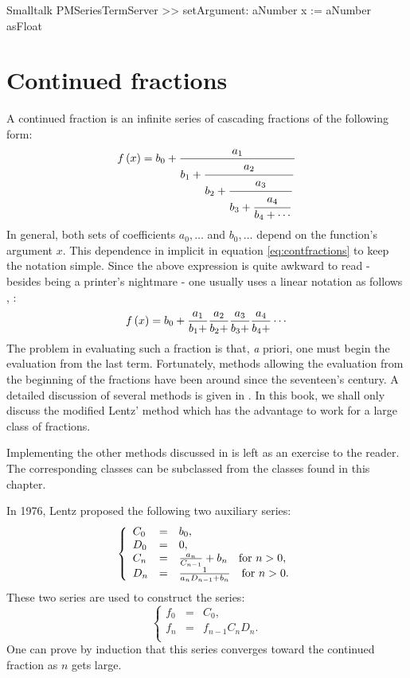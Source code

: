 \begin{displaycode}{Smalltalk}
PMSeriesTermServer >> setArgument: aNumber
    x := aNumber asFloat
\end{displaycode}

\section{Continued fractions}
\label{sec:contfractions}
A continued fraction is an infinite series of cascading fractions of the following form:
\begin{equation}
\label{eq:contfractions}
  f\left( x\right)=b_0+{a_1 \over\displaystyle b_1+
  {\strut a_2 \over\displaystyle b_2+{\strut a_3 \over\displaystyle b_3+
  {\strut a_4 \over\displaystyle b_4+\cdots}}}}
\end{equation}
In general, both sets of coefficients $a_0,\ldots$ and
$b_0,\ldots$ depend on the function's argument $x$. This
dependence in implicit in equation \ref{eq:contfractions} to keep
the notation simple. Since the above expression is quite awkward
to read - besides being a printer's nightmare - one usually uses a
linear notation as follows \cite{AbrSteg}, \cite{Press}:
\begin{equation}
\label{eq:contfractionsline}
  f\left( x\right)=b_0+{a_1 \over b_1+}{a_2 \over b_2+}{a_3 \over b_3+}{a_4 \over
  b_4+}\cdots
\end{equation}
The problem in evaluating such a fraction is that, {\textit a priori},
one must begin the evaluation from the last term. Fortunately,
methods allowing the evaluation from the beginning of the
fractions have been around since the seventeen's century. A
detailed discussion of several methods is given in \cite{Press}.
In this book, we shall only discuss the modified Lentz' method
which has the advantage to work for a large class of fractions.

Implementing the other methods discussed in \cite{Press} is left
as an exercise to the reader. The corresponding classes can be
subclassed from the classes found in this chapter.

In 1976, Lentz proposed the following two auxiliary series:
\begin{equation}
  \left\{{
  \begin{array}{lcl}
    C_0 & = & b_0,\\
    D_0 & = & 0, \\
    C_n & = & {a_n \over C_{n-1}}+b_n\mbox{\quad for $n>0$}, \\
    D_n & = & {1 \over a_n D_{n-1}+b_n}\mbox{\quad for $n>0$}.
  \end{array}
  }\right.
\end{equation}
These two series are used to construct the series:
\begin{equation}
  \left\{{
  \begin{array}{lcl}
    f_0 & = & C_0,\\
    f_n & = & f_{n-1}C_n D_n. \\
  \end{array}
  }\right.
\end{equation}
One can prove by induction that this series converges toward the
continued fraction as $n$ gets large.

